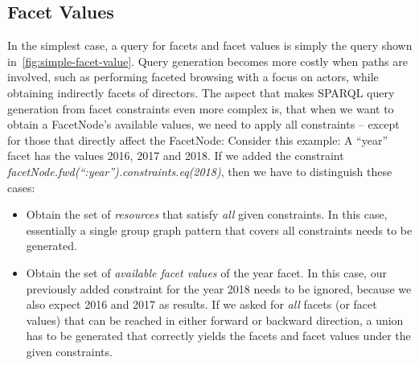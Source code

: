 \subsection{Facet Values}
In the simplest case, a query for facets and facet values is simply the query shown in~\autoref{fig:simple-facet-value}.
Query generation becomes more costly when paths are involved, such as
performing faceted browsing with a focus on actors, while obtaining indirectly facets of directors.
The aspect that makes SPARQL query generation from facet constraints even more complex is, that when we want to obtain a FacetNode's available values, we need to apply all constraints -- except for those that directly affect the FacetNode:
Consider this example: A ``year'' facet has the values 2016, 2017 and 2018. If we added the constraint \emph{facetNode.fwd(``:year'').constraints.eq(2018)}, then we have to distinguish these cases:
\begin{itemize}
\item Obtain the set of \emph{resources} that satisfy \emph{all} given constraints.
In this case, essentially a single group graph pattern that covers all constraints needs to be generated.
\item Obtain the set of \emph{available facet values} of the year facet.
In this case, our previously added constraint for the year 2018 needs to be ignored,
because we also expect 2016 and 2017 as results.
If we asked for \emph{all} facets (or facet values) that can be reached in either forward or backward direction,
a union has to be generated that correctly yields the facets and facet values under the given constraints.
\end{itemize}







